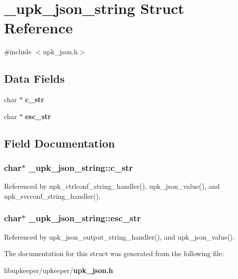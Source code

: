 \section{\_\-upk\_\-json\_\-string Struct Reference}
\label{struct__upk__json__string}


{\ttfamily \#include $<$upk\_\-json.h$>$}

\subsection*{Data Fields}
\begin{DoxyCompactItemize}
\item 
char $\ast$ {\bf c\_\-str}
\item 
char $\ast$ {\bf esc\_\-str}
\end{DoxyCompactItemize}


\subsection{Field Documentation}
\subsubsection[{c\_\-str}]{\setlength{\rightskip}{0pt plus 5cm}char$\ast$ {\bf \_\-upk\_\-json\_\-string::c\_\-str}}\label{struct__upk__json__string_a8b78a10bbc10841a205841c2d7f553ba}


Referenced by upk\_\-ctrlconf\_\-string\_\-handler(), upk\_\-json\_\-value(), and upk\_\-svcconf\_\-string\_\-handler().

\subsubsection[{esc\_\-str}]{\setlength{\rightskip}{0pt plus 5cm}char$\ast$ {\bf \_\-upk\_\-json\_\-string::esc\_\-str}}\label{struct__upk__json__string_a82f33532ffb2237425cf6b618f7aa977}


Referenced by upk\_\-json\_\-output\_\-string\_\-handler(), and upk\_\-json\_\-value().



The documentation for this struct was generated from the following file:\begin{DoxyCompactItemize}
\item 
libupkeeper/upkeeper/{\bf upk\_\-json.h}\end{DoxyCompactItemize}
